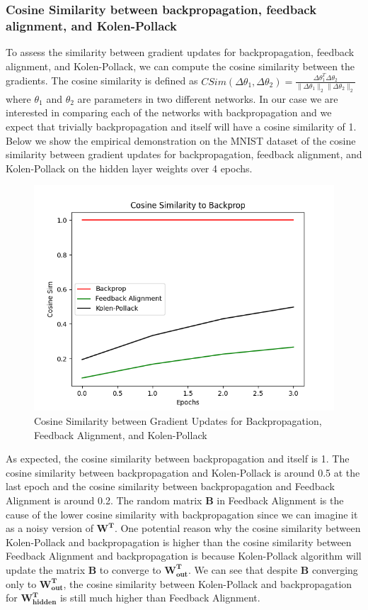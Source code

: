 \documentclass[12pt, letterpaper]{article}
\begin{document}
\subsubsection{Cosine Similarity between backpropagation, feedback alignment, and Kolen-Pollack}

To assess the similarity between gradient updates for backpropagation, feedback alignment, and Kolen-Pollack, we can compute the cosine similarity between the gradients. The cosine similarity is defined as $C Sim(\Delta \theta_1, \Delta \theta_2) = \frac{\Delta \theta_1^T \Delta \theta_2}{\|\Delta \theta_1\|_2 \|\Delta \theta_2\|_2}$ where $\theta_1$ and $\theta_2$ are parameters in two different networks. In our case we are interested in comparing each of the networks with backpropagation and we expect that trivially backpropagation and itself will have a cosine similarity of 1. Below we show the empirical demonstration on the MNIST dataset of the cosine similarity between gradient updates for backpropagation, feedback alignment, and Kolen-Pollack on the hidden layer weights over 4 epochs.

\begin{figure}[H]
    \centering
    \includegraphics[width=.7\textwidth]{cosine_similarity.png}
    \caption{Cosine Similarity between Gradient Updates for Backpropagation, Feedback Alignment, and Kolen-Pollack}
    \label{fig:cosine_similarity}
\end{figure}

As expected, the cosine similarity between backpropagation and itself is 1. The cosine similarity between backpropagation and Kolen-Pollack is around 0.5 at the last epoch and the cosine similarity between backpropagation and Feedback Alignment is around 0.2. The random matrix $\mathbf{B}$ in Feedback Alignment is the cause of the lower cosine similarity with backpropagation since we can imagine it as a noisy version of $\mathbf{W^T}$. One potential reason why the cosine similarity between Kolen-Pollack and backpropagation is higher than the cosine similarity between Feedback Alignment and backpropagation is because Kolen-Pollack algorithm will update the matrix $\mathbf{B}$ to converge to $\mathbf{W_{\text{out}}^T}$. We can see that despite $\mathbf{B}$ converging only to $\mathbf{W_{\text{out}}^T}$, the cosine similarity between Kolen-Pollack and backpropagation for $\mathbf{W_{\text{hidden}}^T}$ is still much higher than Feedback Alignment.
\end{document}
